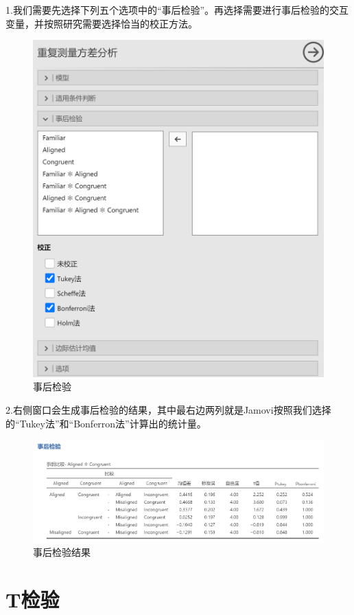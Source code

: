 \documentclass[]{ctexbook}
\theoremstyle{definition}
\theoremstyle{definition}
\theoremstyle{definition}
\theoremstyle{definition}
\theoremstyle{remark}
\begin{document}
1.我们需要先选择下列五个选项中的``事后检验''。再选择需要进行事后检验的交互变量，并按照研究需要选择恰当的校正方法。

\begin{figure}

{\centering \includegraphics[width=0.6\linewidth]{img/jamovi/rmanova-posthoc} 

}

\caption{事后检验}\label{fig:jamovi-rmanova-posthoc2}
\end{figure}

2.右侧窗口会生成事后检验的结果，其中最右边两列就是Jamovi按照我们选择的``Tukey法''和``Bonferron法''计算出的统计量。

\begin{figure}

{\centering \includegraphics[width=1\linewidth]{img/jamovi/rmanova-posthoc-results} 

}

\caption{事后检验结果}\label{fig:jamovi-rmanova-posthoc-results}
\end{figure}

\section{T检验}\label{tux68c0ux9a8c}
\end{document}
